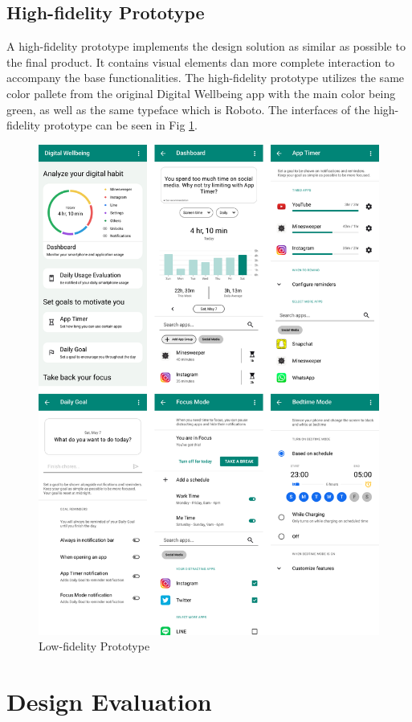 \documentclass[conference]{IEEEtran}
\begin{document}
\subsection{High-fidelity Prototype}
A high-fidelity prototype implements the design solution as similar as possible to the final product. It contains visual elements dan more complete interaction to accompany the base functionalities. The high-fidelity prototype utilizes the same color pallete from the original Digital Wellbeing app with the main color being green, as well as the same typeface which is Roboto. The interfaces of the high-fidelity prototype can be seen in Fig \ref{fig:hifi}.

\begin{figure}[htbp]
  \centerline{\includegraphics[width=0.9\linewidth]{hifi.png}}
  \caption{Low-fidelity Prototype} \label{fig:hifi}
\end{figure}


\section{Design Evaluation}
\end{document}
